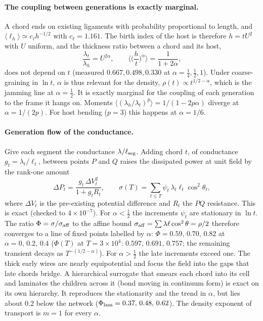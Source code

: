 \paragraph{The coupling between generations is exactly marginal.}
A chord ends on existing ligaments with probability proportional to length,
and $\langle\ell_h\rangle\simeq c_\ell h^{-1/2}$ with $c_\ell=1.161$. The
birth index of the host is therefore $h=tU^2$ with $U$ uniform, and the
thickness ratio between a chord and its host,
\begin{equation}
  \frac{\lambda_t}{\lambda_h} = U^{2\alpha},\qquad
  \Big\langle \Big(\frac{h}{t}\Big)^{\alpha}\Big\rangle=\frac{1}{1+2\alpha},
\end{equation}
does not depend on $t$ (measured $0.667, 0.498, 0.330$ at $\alpha=\tfrac14,\tfrac12,1$).
Under coarse-graining in $\ln t$, $\alpha$ is thus relevant for the density,
$\rho(t)\propto t^{1/2-\alpha}$, which is the jamming line at $\alpha=\tfrac12$.
It is exactly marginal for the coupling of each generation to the frame it
hangs on. Moments $\langle(\lambda_h/\lambda_t)^p\rangle=1/(1-2p\alpha)$
diverge at $\alpha=1/(2p)$. For host bending ($p=3$) this happens at
$\alpha=1/6$.

\paragraph{Generation flow of the conductance.}
Give each segment the conductance $\lambda/\ell_{\rm seg}$. Adding chord $t$,
of conductance $g_t=\lambda_t/\ell_t$, between points $P$ and $Q$ raises the
dissipated power at unit field by the rank-one amount
\begin{equation}
  \Delta P_t=\frac{g_t\,\Delta V_t^2}{1+g_tR_t},
  \qquad
  \sigma(T)=\sum_{t\le T}\psi_t\,\lambda_t\ell_t\cos^2\theta_t ,
\end{equation}
where $\Delta V_t$ is the pre-existing potential difference and $R_t$ the
$PQ$ resistance. This is exact (checked to $4\times10^{-7}$). For
$\alpha<\tfrac12$ the increments $\psi_t$ are stationary in $\ln t$. The ratio
$\Phi=\sigma/\sigma_{\rm aff}$ to the affine bound
$\sigma_{\rm aff}=\sum\lambda\ell\cos^2\theta=\rho/2$ therefore converges to a
line of fixed points labelled by $\alpha$:
$\Phi=0.59,\,0.70,\,0.82$ at $\alpha=0,\,0.2,\,0.4$ ($\Phi(T)$ at $T=3\times10^4$:
$0.597,\,0.691,\,0.757$; the remaining transient decays as $T^{-(1/2-\alpha)}$).
For $\alpha>\tfrac12$ the late increments exceed one. The thick early wires are
nearly equipotential and focus the field into the gaps that late chords
bridge. A hierarchical surrogate that smears each chord into its cell and
laminates the children across it (bond moving in continuum form) is exact on
its own hierarchy. It reproduces the stationarity and the trend in $\alpha$,
but lies about $0.2$ below the network ($\Phi_{\rm lam}=0.37,\,0.48,\,0.62$).
The density exponent of transport is $m=1$ for every $\alpha$.

